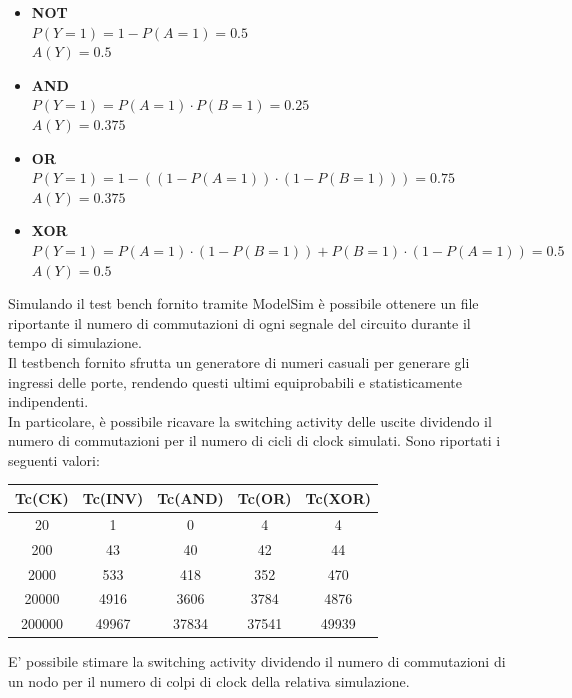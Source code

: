 \documentclass[11pt,  english, makeidx, a4paper, titlepage, oneside]{book}
\begin{document}
\begin{itemize}
	\item \textbf{NOT} \\
	$P(Y=1) = 1 - P(A=1) = 0.5$ \\
	$A(Y) = 0.5$
	\item \textbf{AND} \\
	$P(Y=1) = P(A=1) \cdot P(B=1) = 0.25$ \\
	$A(Y) = 0.375$
	\item \textbf{OR} \\
	$P(Y=1) = 1-((1-P(A=1)) \cdot(1-P(B=1))) = 0.75$ \\
	$A(Y) = 0.375$
	\item \textbf{XOR} \\
	$P(Y=1) = P(A=1) \cdot(1-P(B=1)) + P(B=1) \cdot(1-P(A=1)) = 0.5$ \\
	$A(Y) = 0.5$ 
\end{itemize} 
Simulando il test bench fornito tramite ModelSim è possibile ottenere un file 
riportante il numero di commutazioni di ogni segnale del circuito durante il 
tempo di simulazione.
\\
Il testbench fornito sfrutta un generatore di numeri casuali per generare gli 
ingressi delle porte, rendendo questi ultimi equiprobabili e statisticamente 
indipendenti.
\\
In particolare, è possibile ricavare la switching activity delle uscite dividendo 
il numero di commutazioni per il numero di cicli di clock simulati.
\newpage
Sono riportati i seguenti valori:
\\
\begin{center}
	\begin{tabular}{|c|c|c|c|c|} %
 	\hline %
 	Tc(CK) & Tc(INV) & Tc(AND) & Tc(OR) & Tc(XOR) \\ 
 	\hline
 	20 & 1 & 0 & 4 & 4 \\ 
 	\hline
 	200 & 43 & 40 & 42 & 44 \\ 
 	\hline
 	2000 & 533 & 418 & 352 & 470 \\
 	\hline
 	20000 & 4916 & 3606 & 3784 & 4876 \\
 	\hline
 	200000 & 49967 & 37834 & 37541 & 49939 \\
 	\hline
	\end{tabular}
\end{center}
\vspace{0.3cm}
E' possibile stimare la switching activity dividendo il numero 
di commutazioni di un nodo per il numero di colpi di clock della
relativa simulazione.
\end{document}
